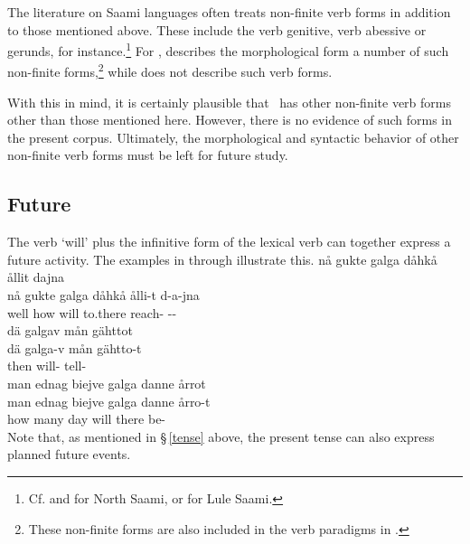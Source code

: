 

The literature on Saami languages often treats non-finite verb forms in addition to those mentioned above. These include the verb genitive, verb abessive or gerunds, for instance.\footnote{Cf. \citealt[103-104]{Sammallahti1998} and \citealt[67-73]{Svonni2009} for North Saami, or \citealt[104-111]{Spiik1989} for Lule Saami.} 
For \PS, \citet[95-106]{Lehtiranta1992} describes the morphological form a number of such non-finite forms,\footnote{These non-finite forms are also included in the verb paradigms in \citet[150-155]{Lehtiranta1992}.} 
while \citet{Lagercrantz1926} does not describe such verb forms. 

With this in mind, it is certainly plausible that \PS\ has other non-finite verb forms other than those mentioned here. However, there is no evidence of such forms in the present corpus. 
Ultimately, the morphological and syntactic behavior of other non-finite verb forms must be left for future study. 



\subsection{Future}\label{futureTense}
The verb  ‘will’ plus the infinitive form of the lexical verb can together express a future activity. The examples in  through  illustrate this.
\ea\label{futureTenseEx1}%
\glll	nå gukte galga dåhkå ållit dajna\\
	nå gukte galga dåhkå ålli-t d-a-jna\\
	well how will\BS{} to.there reach- --\\\nopagebreak
{}	
\z
\ea\label{futureTenseEx2}%
\glll	dä galgav mån gähttot\\
	dä galga-v mån gähtto-t\\
	then will-  tell-\\\nopagebreak
{}	
\z
\ea\label{futureTenseEx3}%
\glll	man ednag biejve galga danne årrot\\
	man ednag biejve galga danne årro-t\\
	how many day\BS{} will\BS{} there be-\\\nopagebreak
{}	
\z
Note that, as mentioned in §\,\ref{tense} above, the present tense can also express planned future events. 

